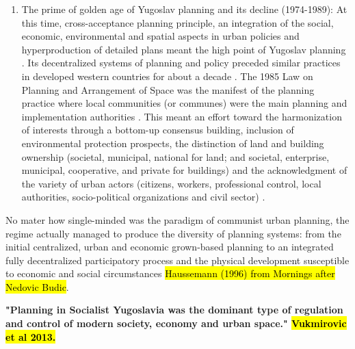 \documentclass[11pt]{report}
\begin{document}
\begin{enumerate}
\item The prime of golden age of Yugoslav planning and its decline (1974-1989):
At this time, cross-acceptance planning principle, an integration of the social, economic, environmental and spatial aspects in urban policies and hyperproduction of detailed plans meant the high point of Yugoslav planning \cite{Mornings after Nedovic Budic}.
Its decentralized systems of planning and policy preceded similar practices in developed western countries for about a decade \cite{Vujosevic Collapse of strategist thinking}.
The 1985 Law on Planning and Arrangement of Space was the manifest of the planning practice where local communities (or communes) were the main planning and implementation authorities \cite{(Vujosevic and Nedovic 2006)}. This meant an effort toward the harmonization of interests through a bottom-up consensus building, inclusion of environmental protection prospects, the distinction of land and building ownership (societal, municipal, national for land; and societal, enterprise, municipal, cooperative, and private for buildings) and the acknowledgment of the variety of urban actors (citizens, workers, professional control, local authorities, socio-political organizations and civil sector) \cite{adjustment of planning practice nedovic budic 2001}.
\end{enumerate}
No mater how single-minded was the  paradigm of communist urban planning, the regime actually managed to produce the diversity of planning systems: from the initial centralized, urban and economic grown-based planning to an integrated fully decentralized participatory process and the physical development susceptible to economic and social circumstances 
\hl{Haussemann (1996) from Mornings after Nedovic Budic}.

\textbf{"Planning  in  Socialist  Yugoslavia  was  the  dominant  type  of  regulation  and  control  of  modern  society, economy and urban space." \hl{Vukmirovic et al 2013.}}
\end{document}
